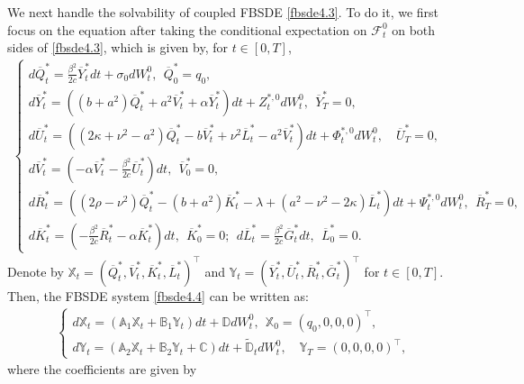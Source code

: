 \documentclass[11pt]{article}
\numberwithin{equation}{section}
\begin{document}
We next handle the solvability of coupled FBSDE \eqref{fbsde4.3}. To do it, we first focus on the equation  after taking the conditional expectation on  $\mathcal{F}_t^0$ on both sides of \eqref{fbsde4.3}, which is given by, for $t\in[0,T]$,
\begin{align}\label{fbsde4.4}
\begin{cases}
\displaystyle d\overline{Q}_t^*=\frac{\beta^2}{2c}\overline{Y}_t^*dt+\sigma_0dW_t^0,~~\overline{Q}_0^*=q_0, \\[0.6em]
\displaystyle d\overline{Y}_t^*=\left((b+a^2)\overline{Q}_t^*+a^2\overline{V}_t^*+\alpha \overline{Y}_t^*\right)dt+Z_t^{*,0}dW_t^0,  ~~\overline{Y}_T^*=0,\\[0.6em]
\displaystyle d\overline{U}_t^*=\left((2\kappa+\nu^2-a^2) \overline{Q}_t^*-b\overline{V}_t^*+\nu^2\overline{L}_t^*-a^2\overline{V}_t^*\right)dt+\Phi_t^{*,0}dW_t^0, \quad \overline{U}_T^*=0,\\[0.6em]
\displaystyle d\overline{V}_t^*=\left(-\alpha \overline{V}_t^*-\frac{\beta^2}{2c}\overline{U}_t^*\right)dt, ~~ \overline{V}_0^*=0,\\[0.6em]
\displaystyle d\overline{R}_t^*=\left((2\rho-\nu^2) \overline{Q}_t^*-(b+a^2)\overline{K}_t^*-\lambda+(a^2-\nu^2-2\kappa)\overline{L}_t^*\right)dt+\Psi_t^{*,0}dW_t^0, ~~\overline{R}_T^*=0, \\[0.6em]
\displaystyle d\overline{K}_t^*=\left(-\frac{\beta^2}{2c}\overline{R}_t^*-\alpha \overline{K}_t^*\right)dt, ~~ \overline{K}_0^*=0;~~d\overline{L}_t^*=\frac{\beta^2}{2c}\overline{G}_t^*dt, ~~\overline{L}_0^*=0.
\end{cases}
\end{align}
Denote by $\mathbb{X}_t=(\overline{Q}_t^*, \overline{V}_t^*, \overline{K}_t^*, \overline{L}_t^*)^{\top}$ and $\mathbb{Y}_t=(\overline{Y}_t^*, \overline{U}_t^*, \overline{R}_t^*, \overline{G}_t^*)^{\top}$ for $t\in[0,T]$. Then, the FBSDE system \eqref{fbsde4.4} can be written as: 
\begin{align}\label{eq:babbXY}
\begin{cases}
\displaystyle d\mathbb{X}_t=(\mathbb{A}_1\mathbb{X}_t+\mathbb{B}_1\mathbb{Y}_t)dt+\mathbb{D}dW_t^0, ~~ \mathbb{X}_0=(q_0,0,0,0)^{\top},\\[0.4em]
\displaystyle d\mathbb{Y}_t=(\mathbb{A}_2\mathbb{X}_t+\mathbb{B}_2\mathbb{Y}_t+\mathbb{C})dt+\widetilde{\mathbb{D}}_tdW_t^0,  \quad \mathbb{Y}_T=(0,0,0,0)^{\top},
\end{cases}	
\end{align}
where the coefficients are given by
\end{document}
